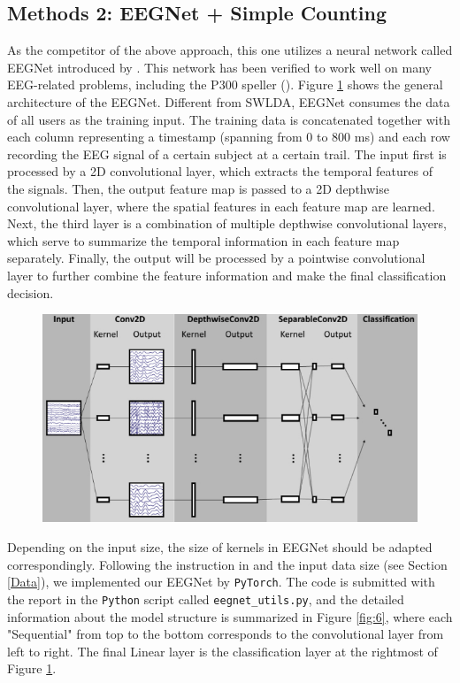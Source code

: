 \documentclass{article}
\begin{document}
\subsection{Methods 2: EEGNet + Simple Counting} \label{EEGNet}
As the competitor of the above approach, this one utilizes a neural network called EEGNet introduced by \cite{lawhern2018eegnet}. This network has been verified to work well on many EEG-related problems, including the P300 speller (\cite{lee2020cnn}). Figure \ref{fig:5} shows the general architecture of the EEGNet. Different from SWLDA, EEGNet consumes the data of all users as the training input. The training data is concatenated together with each column representing a timestamp (spanning from $0$ to $800$ ms) and each row recording the EEG signal of a certain subject at a certain trail. The input first is processed by a 2D convolutional layer, which extracts the temporal features of the signals. Then, the output feature map is passed to a 2D depthwise convolutional layer, where the spatial features in each feature map are learned. Next, the third layer is a combination of multiple depthwise convolutional layers, which serve to summarize the temporal information in each feature map separately. Finally, the output will be processed by a pointwise convolutional layer to further combine the feature information and make the final classification decision.

\begin{figure}[H]
	\centering
	\includegraphics[width=0.7\linewidth]{architecture.jpg}
	\label{fig:5}
\end{figure}

\vspace{-3mm}
Depending on the input size, the size of kernels in EEGNet should be adapted correspondingly. Following the instruction in \cite{lawhern2018eegnet} and the input data size (see Section \ref{Data}), we implemented our EEGNet by \texttt{PyTorch}. The code is submitted with the report in the \texttt{Python} script called \texttt{eegnet\_utils.py}, and the detailed information about the model structure is summarized in Figure \ref{fig:6}, where each "Sequential" from top to the bottom corresponds to the convolutional layer from left to right. The final Linear layer is the classification layer at the rightmost of Figure \ref{fig:5}.
\end{document}
